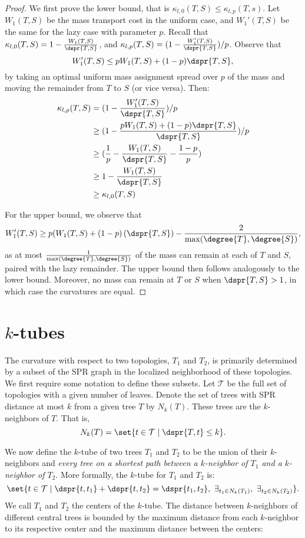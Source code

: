 \documentclass{amsart}
\newcommand{\TT}{\mathcal T}
\begin{document}
\begin{proof}
	We first prove the lower bound, that is $\kappa_{l,0}(T,S) \le \kappa_{l,p}(T,s)$.
	Let $W_1(T,S)$ be the mass transport cost in the uniform case, and $W_1'(T,S)$ be the same for the lazy case with parameter $p$.
	Recall that $\kappa_{l,0}(T,S) = 1 - \frac{W_1(T,S)}{\dspr{T,S}}$, and $\kappa_{l,p}(T,S) = (1 - \frac{W_1'(T,S)}{\dspr{T,S}}) / p$.
	Observe that $$W_1'(T,S) \le pW_1(T,S) + (1-p)\dspr{T,S},$$ by taking an optimal uniform mass assignment spread over $p$ of the mass and moving the remainder from $T$ to $S$ (or vice versa).
	Then:
	\begin{align}
		\kappa_{l,p}(T,S) &= (1 - \frac{W_1'(T,S)}{\dspr{T,S}}) / p \\
		&\ge (1 - \frac{pW_1(T,S) + (1-p)\dspr{T,S}}{\dspr{T,S}}) / p \\
		&\ge (\frac{1}{p} - \frac{W_1(T,S)}{\dspr{T,S}} - \frac{1-p}{p}) \\
		&\ge 1 - \frac{W_1(T,S)}{\dspr{T,S}} \\
		&\ge \kappa_{l,0}(T,S)
	\end{align}

	For the upper bound, we observe that $$W_1'(T,S) \ge p(W_1(T,S) + (1-p)\left(\dspr{T,S}\right) - \frac{2}{\max(\degree{T}, \degree{S})},$$ as at most $\frac{1}{\max(\degree{T},\degree{S})}$ of the mass can remain at each of $T$ and $S$, paired with the lazy remainder.
	The upper bound then follows analogously to the lower bound.
	Moreover, no mass can remain at $T$ or $S$ when $\dspr{T,S} > 1$, in which case the curvatures are equal.
\end{proof}






\section{$k$-tubes}

The curvature with respect to two topologies, $T_1$ and $T_2$, is primarily determined by a subset of the SPR graph in the localized neighborhood of these topologies.
We first require some notation to define these subsets.
Let $\TT$ be the full set of topologies with a given number of leaves.
Denote the set of trees with SPR distance at most $k$ from a given tree $T$ by $N_k(T)$.
These trees are the $k$-neighbors of $T$.
That is, $$ N_k(T) = \set{t \in \TT \mid \dspr{T, t} \le k} .$$

We now define the $k$-tube of two trees $T_1$ and $T_2$ to be the union of their $k$-neighbors and \emph{every tree on a shortest path between a $k$-neighbor of $T_1$ and a $k$-neighbor of $T_2$}.
More formally, the $k$-tube for $T_1$ and $T_2$ is:
\[ \set{t \in \TT \mid \dspr{t, t_1} + \dspr{t, t_2} = \dspr{t_1, t_2},\ \exists_{t_1 \in N_k(T_1)},\ \exists_{t_2 \in N_k(T_2)} } .\]
We call $T_1$ and $T_2$ the centers of the $k$-tube.
The distance between $k$-neighbors of different central trees is bounded by the maximum distance from each $k$-neighbor to its respective center and the maximum distance between the centers:
\end{document}
